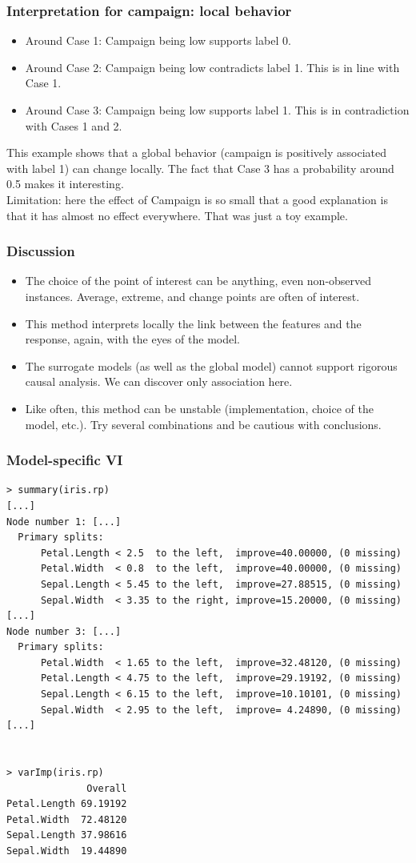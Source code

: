 \begin{frame}
\frametitle{Interpretation for campaign: local behavior}
\begin{itemize}
\item Around Case 1: Campaign being low supports label 0. 
\item Around Case 2: Campaign being low contradicts label 1. This is in line with Case 1.
\item Around Case 3: Campaign being low supports label 1. This is in contradiction with Cases 1 and 2. 
\end{itemize}
This example shows that a global behavior (campaign is positively associated with label 1) can change locally. The fact that Case 3 has a probability around 0.5 makes it interesting. \\
\vspace{0.2cm}
Limitation: here the effect of Campaign is so small that a good explanation is that it has almost no effect everywhere. That was just a toy example.
\end{frame}
\begin{frame}
\frametitle{Discussion}
\begin{itemize}
\item The choice of the point of interest can be anything, even non-observed instances. Average, extreme, and change points are often of interest.
\item This method interprets locally the link between the features and the response, again, with the eyes of the model.
\item The surrogate models (as well as the global model) cannot support rigorous causal analysis. We can discover only association here. 
\item Like often, this method can be unstable (implementation, choice of the model, etc.). Try several combinations and be cautious with conclusions.
\end{itemize}
\end{frame}


\begin{frame}[fragile]
\frametitle{Model-specific VI}
\tiny
\begin{verbatim}
> summary(iris.rp)
[...]
Node number 1: [...]
  Primary splits:
      Petal.Length < 2.5  to the left,  improve=40.00000, (0 missing)
      Petal.Width  < 0.8  to the left,  improve=40.00000, (0 missing)
      Sepal.Length < 5.45 to the left,  improve=27.88515, (0 missing)
      Sepal.Width  < 3.35 to the right, improve=15.20000, (0 missing)
[...]
Node number 3: [...]
  Primary splits:
      Petal.Width  < 1.65 to the left,  improve=32.48120, (0 missing)
      Petal.Length < 4.75 to the left,  improve=29.19192, (0 missing)
      Sepal.Length < 6.15 to the left,  improve=10.10101, (0 missing)
      Sepal.Width  < 2.95 to the left,  improve= 4.24890, (0 missing)
[...]


> varImp(iris.rp)
              Overall
Petal.Length 69.19192
Petal.Width  72.48120
Sepal.Length 37.98616
Sepal.Width  19.44890
\end{verbatim}
\end{frame}

